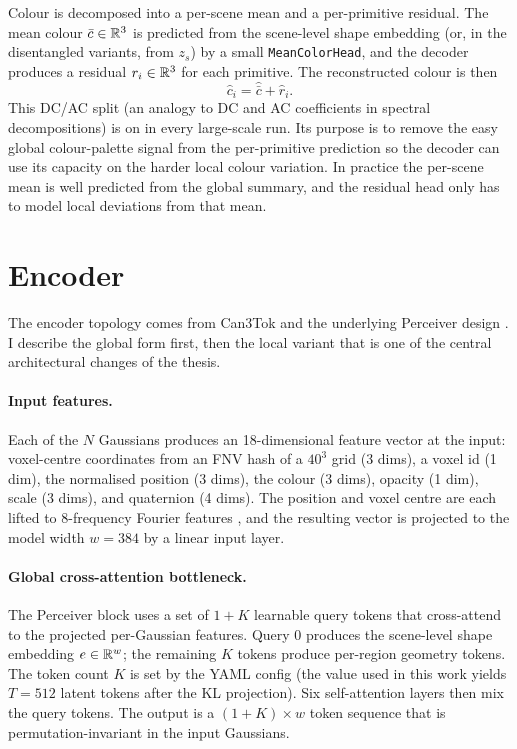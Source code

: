 Colour is decomposed into a per-scene mean and a per-primitive residual. The mean colour $\bar{c} \in \mathbb{R}^3$ is predicted from the scene-level shape embedding (or, in the disentangled variants, from $z_s$) by a small \texttt{MeanColorHead}, and the decoder produces a residual $r_i \in \mathbb{R}^3$ for each primitive. The reconstructed colour is then
\begin{equation}
\hat{c}_i = \hat{\bar{c}} + \hat{r}_i.
\label{eq:colour_residual}
\end{equation}
This DC/AC split (an analogy to DC and AC coefficients in spectral decompositions) is on in every large-scale run. Its purpose is to remove the easy global colour-palette signal from the per-primitive prediction so the decoder can use its capacity on the harder local colour variation. In practice the per-scene mean is well predicted from the global summary, and the residual head only has to model local deviations from that mean.

\section{Encoder}
\label{sec:method_encoder}

The encoder topology comes from Can3Tok \citep{gao2025can3tok} and the underlying Perceiver design \citep{jaegle2021perceiver, jaegle2022perceiverio}. I describe the global form first, then the local variant that is one of the central architectural changes of the thesis.

\paragraph{Input features.} Each of the $N$ Gaussians produces an 18-dimensional feature vector at the input: voxel-centre coordinates from an FNV hash of a $40^3$ grid (3 dims), a voxel id (1 dim), the normalised position (3 dims), the colour (3 dims), opacity (1 dim), scale (3 dims), and quaternion (4 dims). The position and voxel centre are each lifted to 8-frequency Fourier features \citep{tancik2020fourier}, and the resulting vector is projected to the model width $w = 384$ by a linear input layer.

\paragraph{Global cross-attention bottleneck.} The Perceiver block uses a set of $1 + K$ learnable query tokens that cross-attend to the projected per-Gaussian features. Query 0 produces the scene-level shape embedding $e \in \mathbb{R}^w$; the remaining $K$ tokens produce per-region geometry tokens. The token count $K$ is set by the YAML config (the value used in this work yields $T = 512$ latent tokens after the KL projection). Six self-attention layers then mix the query tokens. The output is a $(1 + K) \times w$ token sequence that is permutation-invariant in the input Gaussians.

